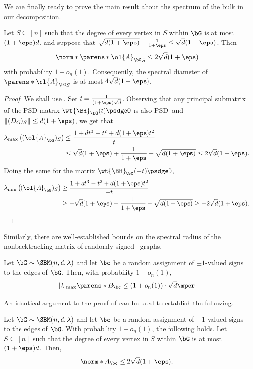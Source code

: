 \documentclass[11pt,letterpaper]{article}
\begin{document}
    We are finally ready to prove the main result about the spectrum of the bulk in our decomposition.
    \begin{lemma}
        \label{lem:bulk-spectral-radius}
        Let $S\subseteq[n]$ such that the degree of every vertex in $S$ within $\bG$ is at most $(1+\eps)d$, and suppose that $\sqrt{d(1+\eps)} + \frac{1}{1+\eps} \le \sqrt{d}(1+\eps)$.
        Then
        \[
            \norm*{\parens*{\ol{A}_{\bG}}_S} \le 2\sqrt{d}(1+\eps)
        \]
        with probability $1-o_n(1)$.
        Consequently, the spectral diameter of $\parens*{\ol{A}_{\bG}}_S$ is at most $4\sqrt{d}(1+\eps)$.
    \end{lemma}
    \begin{proof}
        We shall use . Set $t = \frac{1}{(1+\eps)\sqrt{d}}$. Observing that any principal submatrix of the PSD matrix $\wt{\BH}_{\bG}(t) \psdge 0$ is also PSD, and $\|(D_G)_S\| \le d(1+\eps)$, we get that
        \begin{align*}
            \lambda_{\mathrm{max}}\left((\ol{A}_{\bG})_S\right) &\le \frac{1 + dt^3 - t^2 + d(1+\eps)t^2}{t} \\
                &\le \sqrt{d}(1+\eps) + \frac{1}{1+\eps} + \sqrt{d(1+\eps)} \le 2\sqrt{d}(1+\eps).
        \end{align*}
        Doing the same for the matrix $\wt{\BH}_{\bG}(-t) \psdge 0$,
        \begin{align*}
            \lambda_{\mathrm{min}}\left((\ol{A}_{\bG})_S\right) &\ge \frac{1 + dt^3 - t^2 + d(1+\eps)t^2}{-t} \\
                &\ge - \sqrt{d}(1+\eps) - \frac{1}{1+\eps} - \sqrt{d(1+\eps)} \ge -2\sqrt{d}(1+\eps). \qedhere
        \end{align*}
    \end{proof}
    Similarly, there are well-established bounds on the spectral radius of the nonbacktracking matrix of randomly signed \erdos--\renyi graphs.
    \begin{lemma}
        Let $\bG\sim \SBM(n, d, \lambda)$ and let $\bc$ be a random assignment of $\pm1$-valued signs to the edges of $\bG$.
        Then, with probability $1-o_n(1)$,
        \[
            |\lambda|_{\max}\parens*{B_{\bc}} \le (1+o_n(1))\cdot\sqrt{d}\mper
        \]
    \end{lemma}
    An identical argument to the proof of  can be used to establish the following.
    \begin{lemma}   \label{lem:bulk-specrad-signed}
        Let $\bG\sim \SBM(n, d, \lambda)$ and let $\bc$ be a random assignment of $\pm1$-valued signs to the edges of $\bG$. With probability $1-o_n(1)$, the following holds.
        Let $S\subseteq[n]$ such that the degree of every vertex in $S$ within $\bG$ is at most $(1+\eps)d$.
        Then,
        \[
            \norm*{A_{\bc}} \le 2\sqrt{d}(1+\eps).
        \]
    \end{lemma}
\end{document}
